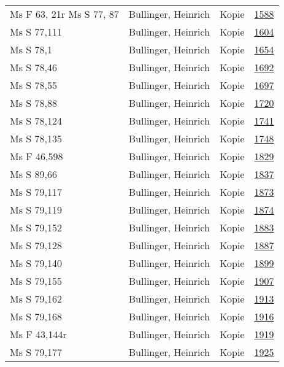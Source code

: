\documentclass[10pt,a4paper,landscape]{report}
\begin{document}
\begin{longtable}{p{16cm}p{4cm}lr}
Ms F 63, 21r  Ms S 77, 87	&	Bullinger, Heinrich	&	Kopie	&	\href{http://130.60.24.72/assignment/1588}{1588}\\
Ms S 77,111	&	Bullinger, Heinrich	&	Kopie	&	\href{http://130.60.24.72/assignment/1604}{1604}\\
Ms S 78,1	&	Bullinger, Heinrich	&	Kopie	&	\href{http://130.60.24.72/assignment/1654}{1654}\\
Ms S 78,46	&	Bullinger, Heinrich	&	Kopie	&	\href{http://130.60.24.72/assignment/1692}{1692}\\
Ms S 78,55	&	Bullinger, Heinrich	&	Kopie	&	\href{http://130.60.24.72/assignment/1697}{1697}\\
Ms S 78,88	&	Bullinger, Heinrich	&	Kopie	&	\href{http://130.60.24.72/assignment/1720}{1720}\\
Ms S 78,124	&	Bullinger, Heinrich	&	Kopie	&	\href{http://130.60.24.72/assignment/1741}{1741}\\
Ms S 78,135	&	Bullinger, Heinrich	&	Kopie	&	\href{http://130.60.24.72/assignment/1748}{1748}\\
Ms F 46,598	&	Bullinger, Heinrich	&	Kopie	&	\href{http://130.60.24.72/assignment/1829}{1829}\\
Ms S 89,66	&	Bullinger, Heinrich	&	Kopie	&	\href{http://130.60.24.72/assignment/1837}{1837}\\
Ms S 79,117	&	Bullinger, Heinrich	&	Kopie	&	\href{http://130.60.24.72/assignment/1873}{1873}\\
Ms S 79,119	&	Bullinger, Heinrich	&	Kopie	&	\href{http://130.60.24.72/assignment/1874}{1874}\\
Ms S 79,152	&	Bullinger, Heinrich	&	Kopie	&	\href{http://130.60.24.72/assignment/1883}{1883}\\
Ms S 79,128	&	Bullinger, Heinrich	&	Kopie	&	\href{http://130.60.24.72/assignment/1887}{1887}\\
Ms S 79,140	&	Bullinger, Heinrich	&	Kopie	&	\href{http://130.60.24.72/assignment/1899}{1899}\\
Ms S 79,155	&	Bullinger, Heinrich	&	Kopie	&	\href{http://130.60.24.72/assignment/1907}{1907}\\
Ms S 79,162	&	Bullinger, Heinrich	&	Kopie	&	\href{http://130.60.24.72/assignment/1913}{1913}\\
Ms S 79,168	&	Bullinger, Heinrich	&	Kopie	&	\href{http://130.60.24.72/assignment/1916}{1916}\\
Ms F 43,144r	&	Bullinger, Heinrich	&	Kopie	&	\href{http://130.60.24.72/assignment/1919}{1919}\\
Ms S 79,177	&	Bullinger, Heinrich	&	Kopie	&	\href{http://130.60.24.72/assignment/1925}{1925}\\

\end{longtable}
\end{document}

